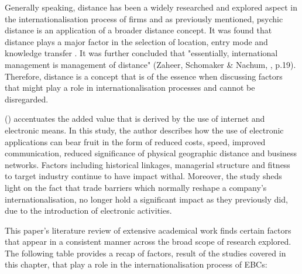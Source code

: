 \documentclass[11pt,a4paper]{article}
\begin{document}
Generally speaking, distance has been a widely researched and explored aspect in the internationalisation process of firms and as previously mentioned, psychic distance is an application of a broader distance concept. It was found that distance plays a major factor in the selection of location, entry mode and knowledge transfer \parencite{xuInstitutionalDistanceMultinational2002, kostovaTransnationalTransferStrategic1999, tihanyiEffectCulturalDistance2005}. It was further concluded that "essentially, international management is management of distance" (Zaheer, Schomaker \& Nachum, \citeyear{zaheerDistanceDirectionRestoring2012}, p.19). Therefore, distance is a concept that is of the essence when discussing factors that might play a role in internationalisation processes and cannot be disregarded. \par
\citeauthor{terziImpactEcommerceInternational2011} (\citeyear{terziImpactEcommerceInternational2011}) accentuates the added value that is derived by the use of internet and electronic means. In this study, the author describes how the use of electronic applications can bear fruit in the form of reduced costs, speed, improved communication, reduced significance of physical geographic distance and business networks. Factors including historical linkages, managerial structure and fitness to target industry continue to have impact withal. Moreover, the study sheds light on the fact that trade barriers which normally reshape a company's internationalisation, no longer hold a significant impact as they previously did, due to the introduction of electronic activities. \par

This paper's literature review of extensive academical work finds certain factors that appear in a consistent manner across the broad scope of research explored. The following table provides a recap of factors, result of the studies covered in this chapter, that play a role in the internationalisation process of EBCs:
\end{document}
